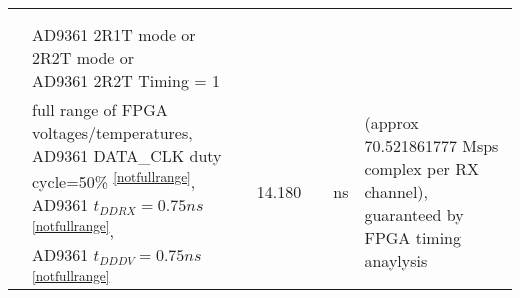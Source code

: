 \documentclass{article}
\begin{document}
\begin{landscape}
\begin{scriptsize}
\begin{longtable}{|c|l|c|c|c|c|l|}
                          &                                      &                                & &                                &                      & \\
                          &                                      &                                & &                                &                      & \\
                          & \multirow{2}{*}{\parbox{6.7 cm}{\hspace*{9mm}AD9361 2R1T mode or 2R2T mode or \\ \hspace*{9mm}AD9361 2R2T Timing = 1}} & & & & & \\
                          &                                      &                                & &                                &                      & \\
                          & \multirow{5}{*}{\parbox{6.7cm}{\hspace*{12mm}full range of FPGA voltages/temperatures,\\ \hspace*{12mm}AD9361 DATA\_CLK duty cycle=50\% \textsuperscript{\ref{notfullrange}}, \\ \hspace*{12mm}AD9361 $t_{DDRX}=0.75 ns$ \textsuperscript{\ref{notfullrange}}, \\ \hspace*{12mm}AD9361 $t_{DDDV}=0.75ns$ \textsuperscript{\ref{notfullrange}} }} & & \multirow{5}{*}{14.180} & & \multirow{5}{*}{ns} & \multirow{5}{*}{\parbox{3.0cm}{(approx 70.521861777 Msps complex per RX channel), \\ guaranteed by FPGA timing anaylysis}} \\
                          &                                      &                                & &                                &                      & \\
                          &                                      &                                & &                                &                      & \\
                          &                                      &                                & &                                &                      & \\
                          &                                      &                                & &                                &                      & \\

\end{longtable}
\end{scriptsize}
\end{landscape}
\end{document}
